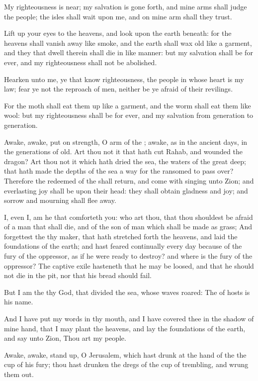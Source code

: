 \verse My righteousness is near; my salvation is gone forth, and mine arms shall judge the people; the isles shall wait upon me, and on mine arm shall they trust.

\verse Lift up your eyes to the heavens, and look upon the earth beneath: for the heavens shall vanish away like smoke, and the earth shall wax old like a garment, and they that dwell therein shall die in like manner: but my salvation shall be for ever, and my righteousness shall not be abolished.

\verse Hearken unto me, ye that know righteousness, the people in whose heart is my law; fear ye not the reproach of men, neither be ye afraid of their revilings.

\verse For the moth shall eat them up like a garment, and the worm shall eat them like wool: but my righteousness shall be for ever, and my salvation from generation to generation.

\verse Awake, awake, put on strength, O arm of the \LORD; awake, as in the ancient days, in the generations of old. Art thou not it that hath cut Rahab, and wounded the dragon?  \verse Art thou not it which hath dried the sea, the waters of the great deep; that hath made the depths of the sea a way for the ransomed to pass over?  \verse Therefore the redeemed of the \LORD shall return, and come with singing unto Zion; and everlasting joy shall be upon their head: they shall obtain gladness and joy; and sorrow and mourning shall flee away.

\verse I, even I, am he that comforteth you: who art thou, that thou shouldest be afraid of a man that shall die, and of the son of man which shall be made as grass; \verse And forgettest the \LORD thy maker, that hath stretched forth the heavens, and laid the foundations of the earth; and hast feared continually every day because of the fury of the oppressor, as if he were ready to destroy? and where is the fury of the oppressor?  \verse The captive exile hasteneth that he may be loosed, and that he should not die in the pit, nor that his bread should fail.

\verse But I am the \LORD thy God, that divided the sea, whose waves roared: The \LORD of hosts is his name.

\verse And I have put my words in thy mouth, and I have covered thee in the shadow of mine hand, that I may plant the heavens, and lay the foundations of the earth, and say unto Zion, Thou art my people.

\verse Awake, awake, stand up, O Jerusalem, which hast drunk at the hand of the \LORD the cup of his fury; thou hast drunken the dregs of the cup of trembling, and wrung them out.

